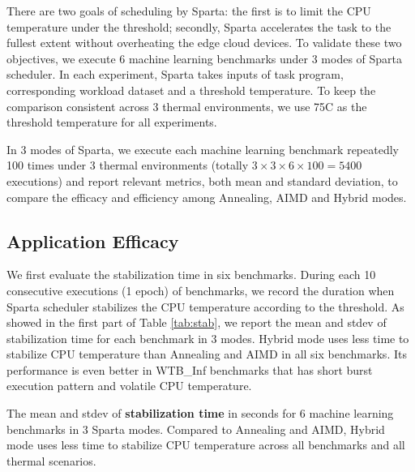 There are two goals of scheduling by Sparta: the first is to limit the CPU temperature under the threshold; secondly, Sparta accelerates the task to the fullest extent without overheating the edge cloud devices. To validate these two objectives, we execute 6 machine learning benchmarks under 3 modes of Sparta scheduler. In each experiment, Sparta takes inputs of task program, corresponding workload dataset and a threshold temperature. To keep the comparison consistent across 3 thermal environments, we use 75\degree C as the threshold temperature for all experiments.

In 3 modes of Sparta, we execute each machine learning benchmark repeatedly 100 times under 3 thermal environments (totally $3 \times 3 \times 6 \times 100 = 5400$ executions) and report relevant metrics, both mean and standard deviation, to compare the efficacy and efficiency among Annealing, AIMD and Hybrid modes.


\subsection{Application Efficacy}

We first evaluate the stabilization time in six benchmarks. During each 10 consecutive executions (1 epoch) of benchmarks, we record the duration when Sparta scheduler stabilizes the CPU temperature according to the threshold. As showed in the first part of Table \ref{tab:stab}, we report the mean and stdev of stabilization time for each benchmark in 3 modes. Hybrid mode uses less time to stabilize CPU temperature than Annealing and AIMD in all six benchmarks. Its performance is even better in WTB\_Inf benchmarks that has short burst execution pattern and volatile CPU temperature.


\begin{table}[t]
\caption{The mean and stdev of \textbf{stabilization time} in seconds for 6 machine learning benchmarks in 3 Sparta modes. Compared to Annealing and AIMD, Hybrid mode uses less time to stabilize CPU temperature across all benchmarks and all thermal scenarios. }\label{tab:stab}
\vspace{1mm}
\centering
\resizebox{350pt}{!}{}
\newline
\vspace{3mm}
\newline
\resizebox{350pt}{!}{}
\end{table}


